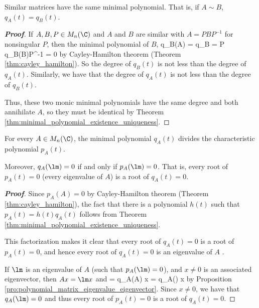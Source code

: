 \begin{corollary}\label{cor:similar_matrices_have_same_minimal_polynomial}
Similar matrices have the same minimal polynomial. That is, if $A\sim B$, $q_A(t) = q_B(t)$.
\end{corollary}

\begin{proof}[\bf Proof]%
If $A,B,P\in M_n(\C)$ and $A$ and $B$ are similar with $A = PBP^{-1}$ for nonsingular $P$, then the minimal polynomial of $B$,
\be
q_B(A) = q_B = P q_B(B)P^{-1} = 0
\ee
by Cayley-Hamilton theorem (Theorem \ref{thm:cayley_hamilton}). So the degree of $q_B(t)$ is not less than the degree of $q_A(t)$. Similarly, we have that the degree of $q_A(t)$ is not less than the degree of $q_B(t)$.

Thus, these two monic minimal polynomials have the same degree and both annihilate $A$, so they must be identical by Theorem \ref{thm:minimal_polynomial_existence_uniqueness}.
\end{proof}



\begin{corollary}\label{cor:characteristic_polynomial_minimal_polynomial_same_roots}
For every $A\in M_n(\C)$, the minimal polynomial $q_A(t)$ divides the characteristic polynomial $p_A(t)$.

Moreover, $q_A(\lm) = 0$ if and only if $p_A(\lm) = 0$. That is, every root of $p_A(t) = 0$ (every eigenvalue of $A$) is a root of $q_A(t) = 0$.
\end{corollary}



\begin{proof}[\bf Proof]
Since $p_A(A) = 0$ by Cayley-Hamilton theorem (Theorem \ref{thm:cayley_hamilton}), the fact that there is a polynomial $h(t)$ such that $p_A(t) = h(t)q_A(t)$ follows from Theorem \ref{thm:minimal_polynomial_existence_uniqueness}.

This factorization makes it clear that every root of $q_A(t) = 0$ is a root of $p_A(t) = 0$, and hence every root of $q_A(t) = 0$ is an eigenvalue of $A$ .

If $\lm$ is an eigenvalue of $A$ (such that $p_A(\lm) = 0$), and $x\neq 0$ is an associated eigenvector, then $Ax = \lm x$ and
 = q_A(A) x = q_A(\lm) x
\ee
by Proposition \ref{pro:polynomial_matrix_eigenvalue_eigenvector}. Since $x\neq 0$, we have that $q_A(\lm) = 0$ and thus every root of $p_A(t) = 0$ is a root of $q_A(t) = 0$.
\end{proof}

